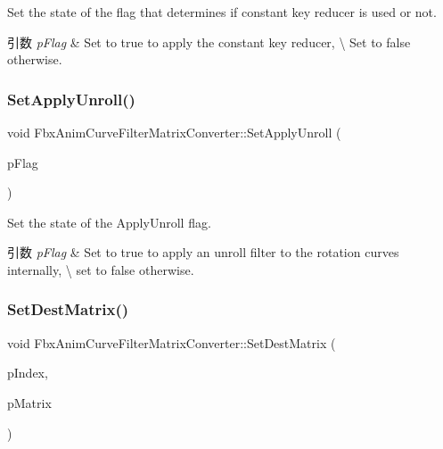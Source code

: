 Set the state of the flag that determines if constant key reducer is used or not. 
\begin{DoxyParams}{引数}
{\em p\+Flag} & Set to {\ttfamily true} to apply the constant key reducer, \textbackslash{} Set to {\ttfamily false} otherwise. \\
\hline
\end{DoxyParams}
\mbox{\label{class_fbx_anim_curve_filter_matrix_converter_abcfe379526feec5a8d3ffc9e3e435d66}} 
\subsubsection{\texorpdfstring{Set\+Apply\+Unroll()}{SetApplyUnroll()}}
{\footnotesize\ttfamily void Fbx\+Anim\+Curve\+Filter\+Matrix\+Converter\+::\+Set\+Apply\+Unroll (\begin{DoxyParamCaption}\item[{bool}]{p\+Flag }\end{DoxyParamCaption})}

Set the state of the Apply\+Unroll flag. 
\begin{DoxyParams}{引数}
{\em p\+Flag} & Set to {\ttfamily true} to apply an unroll filter to the rotation curves internally, \textbackslash{} set to {\ttfamily false} otherwise. \\
\hline
\end{DoxyParams}
\mbox{\label{class_fbx_anim_curve_filter_matrix_converter_a5eafea6927cc0698df3a1a9c2cdb3b7d}} 
\subsubsection{\texorpdfstring{Set\+Dest\+Matrix()}{SetDestMatrix()}}
{\footnotesize\ttfamily void Fbx\+Anim\+Curve\+Filter\+Matrix\+Converter\+::\+Set\+Dest\+Matrix (\begin{DoxyParamCaption}\item[{\hyperlink{class_fbx_anim_curve_filter_matrix_converter_a41638d5acd6d14ef0f095ab75b18ee69}{E\+Matrix\+Index}}]{p\+Index,  }\item[{\hyperlink{class_fbx_a_matrix}{Fbx\+A\+Matrix} \&}]{p\+Matrix }\end{DoxyParamCaption})}

